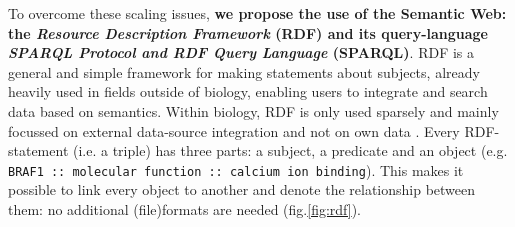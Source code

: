 \documentclass[twoside,fontsize=10pt]{article}
\begin{document}
\noindent
To overcome these scaling issues, \textbf{we propose the use of the Semantic Web: the \textit{Resource Description Framework} (RDF) and its query-language \textit{SPARQL Protocol and RDF Query Language} (SPARQL)}. RDF is a general and simple framework for making statements about subjects, already heavily used in fields outside of biology, enabling users to integrate and search data based on semantics. Within biology, RDF is only used sparsely and mainly focussed on external data-source integration and not on own data \cite{Belleau2008,Neumann2006,Sahoo2008}. Every RDF-statement (i.e. a triple) has three parts: a subject, a predicate and an object (e.g. \lstinline|BRAF1 :: molecular function :: calcium ion binding|). This makes it possible to link every object to another and denote the relationship between them: no additional (file)formats are needed (fig.\ref{fig:rdf}). 
\end{document}
